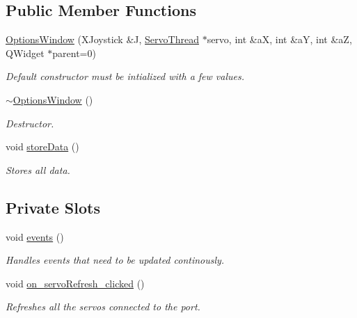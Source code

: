 \subsection*{Public Member Functions}
\begin{DoxyCompactItemize}
\item 
\hyperlink{a00005_a968da93eec85561ebdb3a464eff15611}{Options\+Window} (X\+Joystick \&J, \hyperlink{a00007}{Servo\+Thread} $\ast$servo, int \&a\+X, int \&a\+Y, int \&a\+Z, Q\+Widget $\ast$parent=0)
\begin{DoxyCompactList}\small\item\em Default constructor must be intialized with a few values. \end{DoxyCompactList}\item 
\hyperlink{a00005_a034c885fe8bb4416e732a9571d14a6b4}{$\sim$\+Options\+Window} ()
\begin{DoxyCompactList}\small\item\em Destructor. \end{DoxyCompactList}\item 
void \hyperlink{a00005_ab0a56ad7347c20046602a7a2a1c83397}{store\+Data} ()
\begin{DoxyCompactList}\small\item\em Stores all data. \end{DoxyCompactList}\end{DoxyCompactItemize}
\subsection*{Private Slots}
\begin{DoxyCompactItemize}
\item 
void \hyperlink{a00005_a18763ff318688083c7ee5a21f22e8e98}{events} ()
\begin{DoxyCompactList}\small\item\em Handles events that need to be updated continously. \end{DoxyCompactList}\item 
void \hyperlink{a00005_ad5365d452e8bcd86cbb64b9ec42c3b7e}{on\+\_\+servo\+Refresh\+\_\+clicked} ()
\begin{DoxyCompactList}\small\item\em Refreshes all the servos connected to the port. \end{DoxyCompactList}\end{DoxyCompactItemize}
